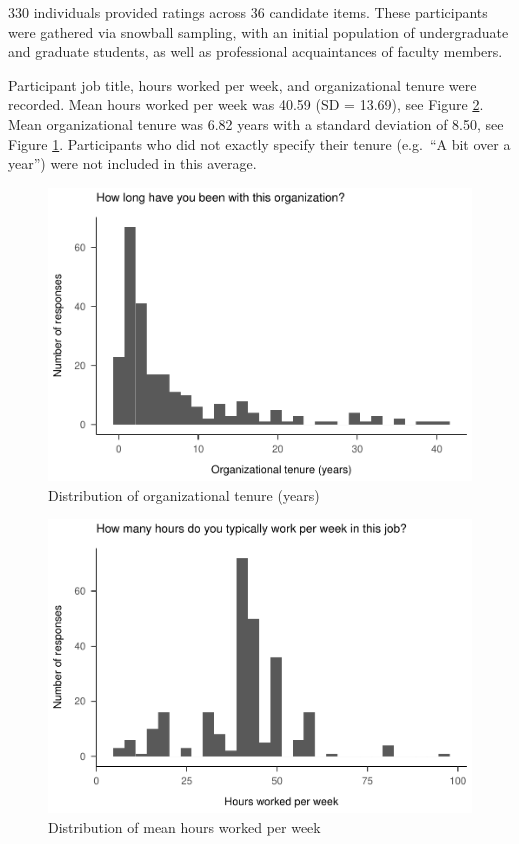 \documentclass[
  english,
  man]{apa6}
\begin{document}
330 individuals provided ratings across 36 candidate items. These participants were gathered via snowball sampling, with an initial population of undergraduate and graduate students, as well as professional acquaintances of faculty members.

Participant job title, hours worked per week, and organizational tenure were recorded. Mean hours worked per week was 40.59 (SD = 13.69), see Figure \ref{fig:hours}. Mean organizational tenure was 6.82 years with a standard deviation of 8.50, see Figure \ref{fig:tenure}. Participants who did not exactly specify their tenure (e.g.~\enquote{A bit over a year}) were not included in this average.

\begin{figure}
\centering
\includegraphics{SIOPpapaja_files/figure-latex/tenure-1.pdf}
\caption{\label{fig:tenure}Distribution of organizational tenure (years)}
\end{figure}

\begin{figure}
\centering
\includegraphics{SIOPpapaja_files/figure-latex/hours-1.pdf}
\caption{\label{fig:hours}Distribution of mean hours worked per week}
\end{figure}
\end{document}
